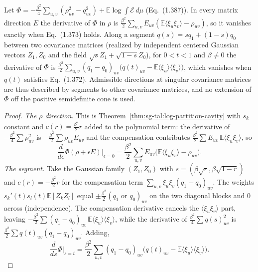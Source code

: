 \begin{theorem}\label{thm:sg-tal:vector-stationarity}
\leanok
{}
Let $\Phi=-\frac{\beta^2}4\sum_{u,v}(\rho_{uv}^2-q_{uv}^2)+\mathbb E\log\int\mathcal E\,d\mu$ (Eq.~(1.387)). In every matrix direction $E$ the derivative of $\Phi$ in $\rho$ is $\frac{\beta^2}2\sum_{u,v}E_{uv}(\mathbb E\langle\xi_u\xi_v\rangle-\rho_{uv})$, so it vanishes exactly when Eq.~(1.373) holds. Along a segment $q(s)=sq_1+(1-s)q_0$ between two covariance matrices (realized by independent centered Gaussian vectors $Z_1,Z_0$ and the field $\sqrt sZ_1+\sqrt{1-s}Z_0$), for $0<t<1$ and $\beta\ne0$ the derivative of $\Phi$ is $\frac{\beta^2}2\sum_{u,v}(q_1-q_0)_{uv}\bigl(q(t)_{uv}-\mathbb E\langle\xi_u\rangle\langle\xi_v\rangle\bigr)$, which vanishes when $q(t)$ satisfies Eq.~(1.372). Admissible directions at singular covariance matrices are thus described by segments to other covariance matrices, and no extension of $\Phi$ off the positive semidefinite cone is used.
\end{theorem}
\begin{proof}
\leanok
\emph{The $\rho$ direction.} This is Theorem~\ref{thm:sg-tal:log-partition-cavity} with $s_k$ constant and $c(r)=\frac{\beta^2}2r$ added to the polynomial term: the derivative of $-\frac{\beta^2}4\sum\rho_{uv}^2$ is $-\frac{\beta^2}2\sum\rho_{uv}E_{uv}$ and the compensation contributes $\frac{\beta^2}2\sum E_{uv}\,\mathbb E\langle\xi_u\xi_v\rangle$, so
\[
\frac d{d\epsilon}\Phi(\rho+\epsilon E)\Big|_{\epsilon=0}=\frac{\beta^2}2\sum_{u,v}E_{uv}\big(\mathbb E\langle\xi_u\xi_v\rangle-\rho_{uv}\big).
\]
\emph{The segment.} Take the Gaussian family $(Z_1,Z_0)$ with $s=(\beta\sqrt r,\beta\sqrt{1-r})$ and $c(r)=-\frac{\beta^2}2r$ for the compensation term $\sum_{u,v}\xi_u\xi_v(q_1-q_0)_{uv}$. The weights $s_k'(t)s_l(t)\mathbb E[Z_kZ_l]$ equal $\pm\frac{\beta^2}2(q_1\text{ or }q_0)_{uv}$ on the two diagonal blocks and $0$ across (independence). The compensation derivative cancels the $\langle\xi_u\xi_v\rangle$ part, leaving $-\frac{\beta^2}2\sum(q_1-q_0)_{uv}\,\mathbb E\langle\xi_u\rangle\langle\xi_v\rangle$, while the derivative of $\frac{\beta^2}4\sum q(s)_{uv}^2$ is $\frac{\beta^2}2\sum q(t)_{uv}(q_1-q_0)_{uv}$. Adding,
\[
\frac d{ds}\Phi\Big|_{s=t}=\frac{\beta^2}2\sum_{u,v}(q_1-q_0)_{uv}\Big(q(t)_{uv}-\mathbb E\langle\xi_u\rangle\langle\xi_v\rangle\Big).
\]
\end{proof}

